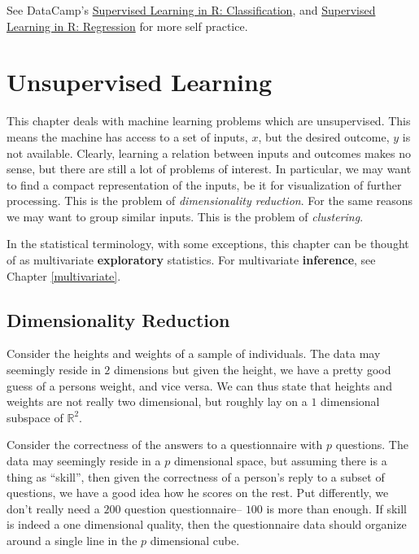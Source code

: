 \documentclass[]{book}
\theoremstyle{definition}
\theoremstyle{definition}
\theoremstyle{definition}
\theoremstyle{remark}
\let\BeginKnitrBlock\begin \let\EndKnitrBlock\end
\begin{document}
See DataCamp's
\href{https://www.datacamp.com/courses/supervised-learning-in-r-classification}{Supervised
Learning in R: Classification}, and
\href{https://www.datacamp.com/courses/supervised-learning-in-r-regression}{Supervised
Learning in R: Regression} for more self practice.

\chapter{Unsupervised Learning}\label{unsupervised}

This chapter deals with machine learning problems which are
unsupervised. This means the machine has access to a set of inputs,
\(x\), but the desired outcome, \(y\) is not available. Clearly,
learning a relation between inputs and outcomes makes no sense, but
there are still a lot of problems of interest. In particular, we may
want to find a compact representation of the inputs, be it for
visualization of further processing. This is the problem of
\emph{dimensionality reduction}. For the same reasons we may want to
group similar inputs. This is the problem of \emph{clustering}.

In the statistical terminology, with some exceptions, this chapter can
be thought of as multivariate \textbf{exploratory} statistics. For
multivariate \textbf{inference}, see Chapter \ref{multivariate}.

\section{Dimensionality Reduction}\label{dim-reduce}

\BeginKnitrBlock{example}
\protect\hypertarget{exm:bmi}{}{\label{exm:bmi} }Consider the heights and
weights of a sample of individuals. The data may seemingly reside in
\(2\) dimensions but given the height, we have a pretty good guess of a
persons weight, and vice versa. We can thus state that heights and
weights are not really two dimensional, but roughly lay on a \(1\)
dimensional subspace of \(\mathbb{R}^2\).
\EndKnitrBlock{example}

\BeginKnitrBlock{example}
\protect\hypertarget{exm:iq}{}{\label{exm:iq} }Consider the correctness of
the answers to a questionnaire with \(p\) questions. The data may
seemingly reside in a \(p\) dimensional space, but assuming there is a
thing as ``skill'', then given the correctness of a person's reply to a
subset of questions, we have a good idea how he scores on the rest. Put
differently, we don't really need a \(200\) question questionnaire--
\(100\) is more than enough. If skill is indeed a one dimensional
quality, then the questionnaire data should organize around a single
line in the \(p\) dimensional cube.
\EndKnitrBlock{example}
\end{document}

